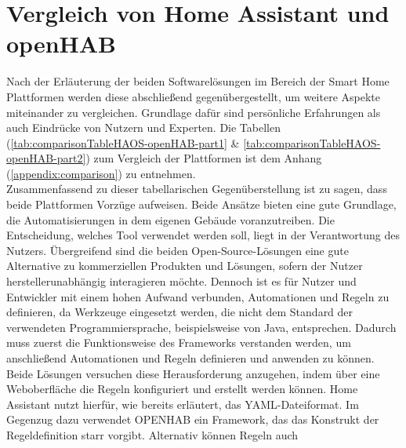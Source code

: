 \section{Vergleich von Home Assistant und openHAB}
\label{sec:comparison-HAOS-openHAB}
    Nach der Erläuterung der beiden Softwarelösungen im Bereich der Smart Home Plattformen werden diese abschließend 
    gegenübergestellt, um weitere Aspekte miteinander zu vergleichen. Grundlage dafür sind persönliche Erfahrungen als auch 
    Eindrücke von Nutzern und Experten. Die Tabellen (\ref{tab:comparisonTableHAOS-openHAB-part1} \& \ref{tab:comparisonTableHAOS-openHAB-part2}) zum Vergleich 
    der Plattformen ist dem Anhang (\ref{appendix:comparison}) zu entnehmen.
    \\
    \linebreak
    Zusammenfassend zu dieser tabellarischen Gegenüberstellung ist zu sagen, dass beide Plattformen Vorzüge aufweisen.  
    Beide Ansätze bieten eine gute Grundlage, die Automatisierungen in dem eigenen Gebäude voranzutreiben. Die Entscheidung, welches 
    Tool verwendet werden soll, liegt in der Verantwortung des Nutzers. Übergreifend sind die beiden Open-Source-Lösungen eine gute 
    Alternative zu kommerziellen Produkten und Lösungen, sofern der Nutzer herstellerunabhängig interagieren möchte. Dennoch ist 
    es für Nutzer und Entwickler mit einem hohen Aufwand verbunden, Automationen und Regeln zu definieren, da Werkzeuge eingesetzt werden, 
    die nicht dem Standard der verwendeten Programmiersprache, beispielsweise von Java, 
    entsprechen. Dadurch muss zuerst die Funktionsweise des Frameworks verstanden werden, um anschließend Automationen und 
    Regeln definieren und anwenden zu können. Beide Lösungen versuchen diese Herausforderung anzugehen, indem über eine Weboberfläche 
    die Regeln konfiguriert und erstellt werden können. Home Assistant nutzt hierfür, wie bereits erläutert, das YAML-Dateiformat. Im 
    Gegenzug dazu verwendet \acs{OPENHAB} ein Framework, das das Konstrukt der Regeldefinition starr vorgibt. Alternativ können Regeln auch 
